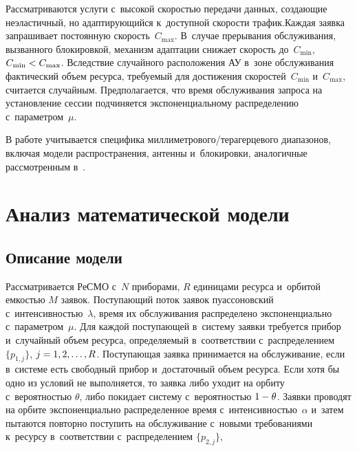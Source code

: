 \begin{multicols}{2}
Рассматриваются услуги с~высокой ско\-ростью передачи данных, соз\-да\-ющие 
неэластичный, но адап\-ти\-ру\-ющий\-ся к~до\-ступ\-ной ско\-рости трафик.\linebreak Каж\-дая за\-яв\-ка 
запрашивает по\-сто\-ян\-ную ско\-рость~$C_{\max}$. В~случае прерывания обслуживания, 
вызванного блокировкой, механизм адап\-та\-ции снижает ско\-рость до~$C_{\min}$, 
$C_{\min}\hm<C_{\max}$. \mbox{Вследствие} случайного расположения АУ в~зоне обслуживания 
фактический объем ресурса, тре\-бу\-емый для достижения скоростей~$C_{\min}$ и~$C_{\max}$, считается случайным. Предполагается, что время обслуживания запроса 
на уста\-нов\-ле\-ние сес\-сии подчиняется экспоненциальному распределению с~па\-ра\-мет\-ром~$\mu$.

В работе учитывается специфика мил\-ли\-мет\-ро\-во\-го/те\-ра\-гер\-це\-во\-го диапазонов, включая 
модели распространения, антенны и~блокировки, аналогичные рас\-смот\-рен\-ным в~\cite{petrov2017interference, gapeyenko2017temporal, begishev2019estimate}.

\section{Анализ математической модели}


\subsection{Описание модели}


Рассматривается РеСМО с~$N$ приборами, $R$ единицами ресурса и~орбитой ем\-костью 
$M$ заявок. По\-сту\-па\-ющий поток заявок пуассоновский с~ин\-тен\-сив\-ностью~$\lambda$, 
время их обслуживания распределено экспоненциально с~па\-ра\-мет\-ром~$\mu$. Для 
каж\-дой по\-сту\-па\-ющей в~сис\-те\-му заявки требуется прибор и~случайный объем ресурса, 
опре\-де\-ля\-емый в~соответствии с~распределением $\{p_{1,j}\}$, $j\hm=1,2,\dots, R$. 
По\-сту\-па\-ющая заявка принимается на обслуживание, если в~сис\-те\-ме есть свободный 
прибор и~достаточный объем ресурса. Если хотя бы одно из условий не выполняется, 
то заявка либо уходит на орбиту с~вероятностью $\theta$, либо покидает сис\-те\-му с~ве\-ро\-ят\-ностью $1\hm-\theta$. Заявки проводят на орбите экспоненциально 
распределенное время с~ин\-тен\-сив\-ностью~$\alpha$ и~затем пытаются повторно 
по\-сту\-пить на обслуживание с~новыми требованиями к~ресурсу в~соответствии с~распределением $\{p_{2,j}\}$,\linebreak
\vspace*{-12pt}


\end{multicols}
